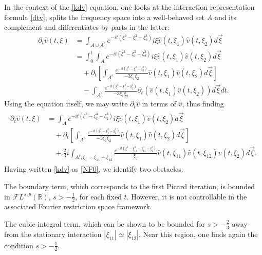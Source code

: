 \documentclass[%
11pt,  reqno]{amsart}
\newcommand{\5}{\textup{V}}
\newcommand{\noi}{\noindent}
\newcommand{\FL}{\mathcal{F} L}
\newcommand{\dt}{\partial_t}
\theoremstyle{remark}
\newcommand{\R}{\mathbb{R}}
\numberwithin{equation}{section}
\numberwithin{theorem}{section}
\begin{document}
\medskip
    
	In the context of the \eqref{kdv} equation, one looks at the interaction representation formula \eqref{dtv}, splits the frequency space into a well-behaved set $A$ and its complement and differentiates-by-parts in the latter:
	\begin{align}
		\dt\widehat{v}(t,\xi)&= \int_{A\cup A^c}e^{-it (\xi^3 -
			\xi_1^3 - \xi_2^3) } i\xi \widehat{v}(t, \xi_1) \widehat{v}(t,\xi_2) d\vec{\xi} 
		\\&\label{NF00}=\int_0^t \int_{A}e^{-it (\xi^3 -
			\xi_1^3 - \xi_2^3) } i\xi \widehat{v}(t, \xi_1) \widehat{v}(t,\xi_2) d\vec{\xi} \\&\quad + \dt\left[ \int_{A^c}\frac{e^{-it (\xi^3 -
				\xi_1^3 - \xi_2^3) }}{-3\xi_1\xi_2}  \widehat{v}(t, \xi_1) \widehat{v}(t,\xi_2) d\vec{\xi}\right] \\&\quad- \int_{A^c}\frac{e^{-it (\xi^3 -
				\xi_1^3 - \xi_2^3) }}{-3\xi_1\xi_2}  \partial_t\left(\widehat{v}(t, \xi_1) \widehat{v}(t,\xi_2)\right) d\vec{\xi}dt
		.
	\end{align}
	Using the equation itself, we may write $\partial_t\widehat{v}$ in terms of $\widehat{v}$, thus finding
	\begin{align}
		\label{NF0}
		\begin{split}
			\dt\widehat{v}(t,\xi)&=  \int_{A}e^{-it (\xi^3 -
				\xi_1^3 - \xi_2^3) } i\xi \widehat{v}(t, \xi_1) \widehat{v}(t,\xi_2) d\vec{\xi}\\&\quad + \dt\left[ \int_{A^c}\frac{e^{-it (\xi^3 -
					\xi_1^3 - \xi_2^3) }}{-3\xi_1\xi_2}  \widehat{v}(t, \xi_1) \widehat{v}(t,\xi_2) d\vec{\xi}\right] \\
			&\quad
			+\frac23 i
			\int_{A^c, \xi_1=\xi_{11}+\xi_{12}}\frac{e^{-it (\xi^3 -
					\xi_{11}^3-
					\xi_{12}^3 - \xi_2^3) }}{\xi_2}  \widehat{v}(t, \xi_{11})\widehat{v}(t, \xi_{12}) \widehat{v}(t,\xi_2) d\vec{\xi}
			.
		\end{split}
	\end{align}
Having written \eqref{kdv} as \eqref{NF0}, we identify two obstacles:

\smallskip
\noi{\rm(i)} The boundary term, which corresponds to the first Picard iteration, is bounded in $\FL^{s,p}(\R)$, $s>-\frac12$, for each fixed $t$. However, it is not controllable in the associated Fourier restriction space framework.

\smallskip
\noi{\rm(ii)} The cubic integral term, which can be shown to be bounded for $s>-\frac23$ away from the stationary interaction $|\xi_{11}|\simeq |\xi_{12}|$. Near this region, one finds again the condition $s>-\frac12$.
\end{document}
